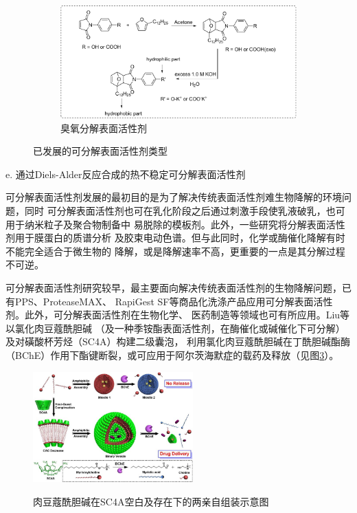 \documentclass[bachelor,winfonts]{jnuthesis} %
\begin{document}
\addtocounter{figure}{-1} %
\begin{figure}[t]
\addtocounter{subfigure}{1} %
        \begin{subfigure}[b]{\textwidth}
            \centering
            \includegraphics[width=\textwidth]{Figure/cleavable-e.pdf}
            \caption{臭氧分解表面活性剂}\label{fig:cleavable-e}
        \end{subfigure}
        \caption{已发展的可分解表面活性剂类型}\label{fig:cleavable-saa}
    \end{figure}
    e. 通过Diels-Alder反应合成的热不稳定可分解表面活性剂
    
    可分解表面活性剂发展的最初目的是为了解决传统表面活性剂难生物降解的环境问题，同时
    可分解表面活性剂也可在乳化阶段之后通过刺激手段使乳液破乳，也可用于纳米粒子及聚合物制备中
    易脱除的模板剂\cite{liu2007}。此外，一些研究将分解表面活性剂用于膜蛋白的质谱分析\cite{norris2003}
    及胶束电动色谱\cite{stanley2012}。但与此同时，化学或酶催化降解有时不能完全适合于微生物的
    降解\cite{tehrani2007}，或是降解速率不高，更重要的一点是其分解过程不可逆\cite{liu2007}。
    
    可分解表面活性剂研究较早，最主要面向解决传统表面活性剂的生物降解问题，已有PPS、ProteaseMAX、
    RapiGest SF等商品化洗涤产品应用可分解表面活性剂。此外，可分解表面活性剂在生物化学、
    医药制造等领域也可有所应用\cite{hellberg2000}。Liu等\cite{guo2012}以氯化肉豆蔻酰胆碱
    （及一种季铵酯表面活性剂，在酶催化或碱催化下可分解）及对磺酸杯芳烃（SC4A）构建二级囊泡，
    利用氯化肉豆蔻酰胆碱在丁酰胆碱酯酶（BChE）作用下酯键断裂，或可应用于阿尔茨海默症的载药及释放（见图\ref{fig:Ch1-SC4A}）。
    
    \begin{figure}[htbp]
        \centering
        \includegraphics[width= 0.55\textwidth]{Figure/Ch1-SC4A}\\
        \caption{肉豆蔻酰胆碱在SC4A空白及存在下的两亲自组装示意图}\label{fig:Ch1-SC4A}
    \end{figure}
        
\end{document}
